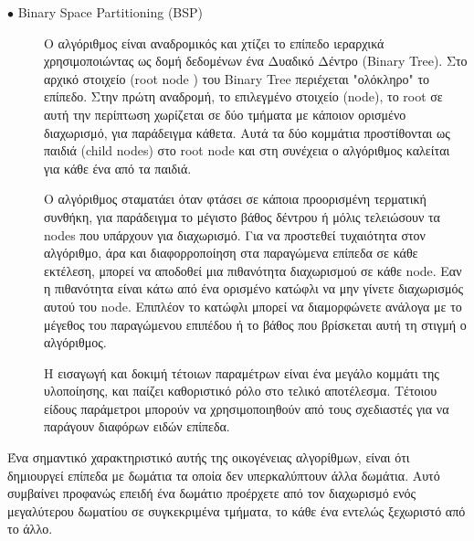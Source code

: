 \begin{description}
  \item[$\bullet$ Binary Space Partitioning (BSP)]
  Ο αλγόριθμος είναι αναδρομικός και χτίζει το επίπεδο ιεραρχικά χρησιμοποιώντας ως δομή δεδομένων ένα Δυαδικό Δέντρο (Binary Tree). Στο αρχικό στοιχείο (root node ) του Binary Tree περιέχεται "ολόκληρο" το επίπεδο. Στην πρώτη αναδρομή, το επιλεγμένο στοιχείο (node), το root σε αυτή την περίπτωση χωρίζεται σε δύο τμήματα με κάποιον ορισμένο διαχωρισμό, για παράδειγμα κάθετα. Αυτά τα δύο κομμάτια προστίθονται ως παιδιά (child nodes) στο root node και στη συνέχεια ο αλγόριθμος καλείται για κάθε ένα από τα παιδιά.
  \par
  Ο αλγόριθμος σταματάει όταν φτάσει σε κάποια προορισμένη τερματική συνθήκη, για παράδειγμα το μέγιστο βάθος δέντρου ή μόλις τελειώσουν τα nodes που υπάρχουν για διαχωρισμό. Για να προστεθεί τυχαιότητα στον αλγόριθμο, άρα και διαφορροποίηση στα παραγώμενα επίπεδα σε κάθε εκτέλεση, μπορεί να αποδοθεί μια πιθανότητα διαχωρισμού σε κάθε node. Εαν η πιθανότητα είναι κάτω από ένα ορισμένο κατώφλι να μην γίνετε διαχωρισμός αυτού του node. Επιπλέον το κατώφλι μπορεί να διαμορφώνετε ανάλογα με το μέγεθος του παραγώμενου επιπέδου ή το βάθος που βρίσκεται αυτή τη στιγμή ο αλγόριθμος.
  \par 
  Η εισαγωγή και δοκιμή τέτοιων παραμέτρων είναι ένα μεγάλο κομμάτι της υλοποίησης, και παίζει καθοριστικό ρόλο στο τελικό αποτέλεσμα. Tέτοιου είδους παράμετροι μπορούν να χρησιμοποιηθούν από τους σχεδιαστές για να παράγουν διαφόρων ειδών επίπεδα.
\end{description}

Ένα σημαντικό χαρακτηριστικό αυτής της οικογένειας αλγορίθμων, είναι ότι δημιουργεί επίπεδα με δωμάτια τα οποία δεν υπερκαλύπτουν άλλα δωμάτια. Αυτό συμβαίνει προφανώς επειδή ένα δωμάτιο προέρχετε από τον διαχωρισμό ενός μεγαλύτερου δωματίου σε συγκεκριμένα τμήματα, το κάθε ένα εντελώς ξεχωριστό από το άλλο.

